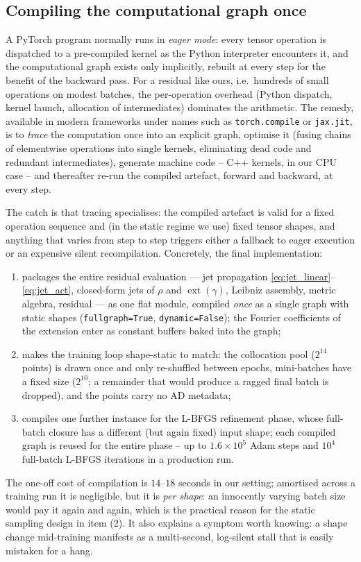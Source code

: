 \documentclass[oneside,british]{amsart}
\numberwithin{equation}{section}
\numberwithin{figure}{section}
\theoremstyle{plain}
\numberwithin{thm}{section}
\theoremstyle{plain}
\theoremstyle{plain}
\theoremstyle{definition}
\theoremstyle{remark}
\DeclareMathOperator{\ext}{\mathrm{ext}}
\begin{document}
\subsection{Compiling the computational graph once}\label{subsec:compile}

A PyTorch program normally runs in \emph{eager mode}: every tensor
operation is dispatched to a pre-compiled kernel as the Python
interpreter encounters it, and the computational graph exists only
implicitly, rebuilt at every step for the benefit of the backward pass.
For a residual like ours, i.e.~hundreds of small operations on modest
batches, the per-operation overhead (Python dispatch, kernel launch,
allocation of intermediates) dominates the arithmetic. The remedy,
available in modern frameworks under names such as
\texttt{torch.compile} \cite{ansel2024pytorch2} or \texttt{jax.jit},
is to \emph{trace} the computation once into an explicit graph,
optimise it (fusing chains of elementwise operations into single
kernels, eliminating dead code and redundant intermediates), generate
machine code -- C++ kernels, in our CPU case -- and thereafter re-run
the compiled artefact, forward and backward, at every step.

The catch is that tracing specialises: the compiled artefact is valid
for a fixed operation sequence and (in the static regime we use) fixed
tensor shapes, and anything that varies from step to step triggers
either a fallback to eager execution or an expensive silent
recompilation. Concretely, the final implementation:
\begin{enumerate}
\item packages the entire residual evaluation --- jet propagation
\eqref{eq:jet_linear}--\eqref{eq:jet_act}, closed-form jets of $\rho$
and $\ext(\gamma)$, Leibniz assembly, metric algebra, residual --- as
one flat module, compiled \emph{once} as a single graph with static
shapes (\texttt{fullgraph=True}, \texttt{dynamic=False}); the Fourier
coefficients of the extension enter as constant buffers baked into the
graph;
\item makes the training loop shape-static to match: the collocation
pool ($2^{14}$ points) is drawn once and only re-shuffled between
epochs, mini-batches have a fixed size ($2^{10}$; a remainder that
would produce a ragged final batch is dropped), and the points carry no
AD metadata;
\item compiles one further instance for the L-BFGS refinement phase,
whose full-batch closure has a different (but again fixed) input shape;
each compiled graph is reused for the entire phase -- up to $1.6\times10^{5}$
Adam steps and $10^{4}$ full-batch L-BFGS iterations in a production
run.
\end{enumerate}
The one-off cost of compilation is $14$--$18$ seconds in our setting; 
amortised across a training run it is negligible, but it is
\emph{per shape}: an innocently varying batch size would pay it again
and again, which is the practical reason for the static sampling
design in item (2). It also explains a symptom worth knowing:
a shape change mid-training manifests as a multi-second,
log-silent stall that is easily mistaken for a hang.
\end{document}
